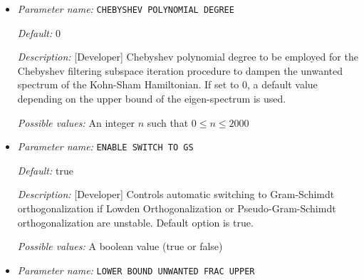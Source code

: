 \begin{itemize}


{\it Default:} 1e-02


{\it Description:} [Developer] Parameter specifying the tolerance to which eigenvectors need to computed using chebyshev filtering approach.


{\it Possible values:} A floating point number $v$ such that $1e-10 \leq v \leq \text{MAX\_DOUBLE}$
\item {\it Parameter name:} {\tt CHEBYSHEV POLYNOMIAL DEGREE}
\label{parameters:SCF parameters/Eigen_2dsolver parameters/CHEBYSHEV POLYNOMIAL DEGREE}
\label{parameters:SCF_20parameters/Eigen_2dsolver_20parameters/CHEBYSHEV_20POLYNOMIAL_20DEGREE}




{\it Default:} 0


{\it Description:} [Developer] Chebyshev polynomial degree to be employed for the Chebyshev filtering subspace iteration procedure to dampen the unwanted spectrum of the Kohn-Sham Hamiltonian. If set to 0, a default value depending on the upper bound of the eigen-spectrum is used.


{\it Possible values:} An integer $n$ such that $0\leq n \leq 2000$
\item {\it Parameter name:} {\tt ENABLE SWITCH TO GS}
\label{parameters:SCF parameters/Eigen_2dsolver parameters/ENABLE SWITCH TO GS}
\label{parameters:SCF_20parameters/Eigen_2dsolver_20parameters/ENABLE_20SWITCH_20TO_20GS}




{\it Default:} true


{\it Description:} [Developer] Controls automatic switching to Gram-Schimdt orthogonalization if Lowden Orthogonalization or Pseudo-Gram-Schimdt orthogonalization are unstable. Default option is true.


{\it Possible values:} A boolean value (true or false)
\item {\it Parameter name:} {\tt LOWER BOUND UNWANTED FRAC UPPER}
\label{parameters:SCF parameters/Eigen_2dsolver parameters/LOWER BOUND UNWANTED FRAC UPPER}
\label{parameters:SCF_20parameters/Eigen_2dsolver_20parameters/LOWER_20BOUND_20UNWANTED_20FRAC_20UPPER}



\end{itemize}

